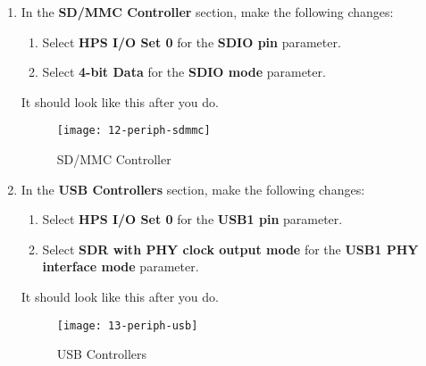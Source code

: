 \begin{flushleft}
\begin{enumerate}[
	label=\textbf{Step \arabic*.},
	leftmargin=*,
	widest={00},
	align=left]
\begin{figure}[H]
\centering
\texttt{[image: 11-periph-qspi]}
\caption{Quad SPI Flash Controller}
\label{fig:11-periph-qspi}
\end{figure}

\item In the \textbf{SD/MMC Controller} section, make the following changes:

\begin{enumerate}[
	label=\textbf{Step \arabic{enumi}\alph*.},
	leftmargin=*,
	align=left]

\item Select \textbf{HPS I/O Set 0} for the \textbf{SDIO pin} parameter.

\item Select \textbf{4-bit Data} for the \textbf{SDIO mode} parameter.

\end{enumerate}

It should look like this after you do.

\begin{figure}[H]
\centering
\texttt{[image: 12-periph-sdmmc]}
\caption{SD/MMC Controller}
\label{fig:12-periph-sdmmc}
\end{figure}

\newpage

\item In the \textbf{USB Controllers} section, make the following changes:

\begin{enumerate}[
	label=\textbf{Step \arabic{enumi}\alph*.},
	leftmargin=*,
	align=left]

\item Select \textbf{HPS I/O Set 0} for the \textbf{USB1 pin} parameter.

\item Select \textbf{SDR with PHY clock output mode} for the \textbf{USB1 PHY interface mode} parameter.

\end{enumerate}

It should look like this after you do.

\begin{figure}[H]
\centering
\texttt{[image: 13-periph-usb]}
\caption{USB Controllers}
\label{fig:13-periph-usb}
\end{figure}


\end{enumerate}
\end{flushleft}
